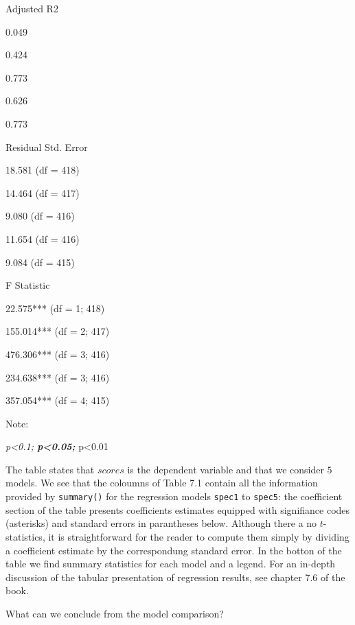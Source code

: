 \documentclass[]{book}
\theoremstyle{definition}
\theoremstyle{definition}
\theoremstyle{definition}
\theoremstyle{remark}
\begin{document}
Adjusted R2

0.049

0.424

0.773

0.626

0.773

Residual Std. Error

18.581 (df = 418)

14.464 (df = 417)

9.080 (df = 416)

11.654 (df = 416)

9.084 (df = 415)

F Statistic

22.575*** (df = 1; 418)

155.014*** (df = 2; 417)

476.306*** (df = 3; 416)

234.638*** (df = 3; 416)

357.054*** (df = 4; 415)

Note:

\emph{p\textless{}0.1; \textbf{p\textless{}0.05; }}p\textless{}0.01

The table states that \(scores\) is the dependent variable and that we
consider \(5\) models. We see that the coloumns of Table 7.1 contain all
the information provided by \texttt{summary()} for the regression models
\texttt{spec1} to \texttt{spec5}: the coefficient section of the table
presents coefficients estimates equipped with signifiance codes
(asterisks) and standard errors in parantheses below. Although there a
no \(t\)-statistics, it is straightforward for the reader to compute
them simply by dividing a coefficient estimate by the correspondung
standard error. In the botton of the table we find summary statistics
for each model and a legend. For an in-depth discussion of the tabular
presentation of regression results, see chapter 7.6 of the book.

What can we conclude from the model comparison?
\end{document}

